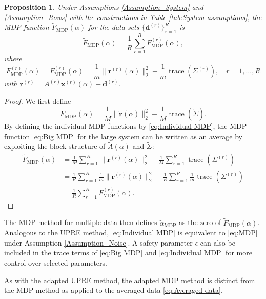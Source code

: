 \documentclass[12pt]{article}
\newcommand{\mA}{m}	%
\newcommand{\dVec}{\mathbf{d}}	%
\newcommand{\rVec}{\mathbf{r}}	%
\newcommand{\xVec}{\mathbf{x}}	%
\DeclareMathOperator{\trace}{trace}		%
\newcommand{\regparam}{\alpha}  %
\newcommand{\rBig}{\widetilde{\rVec}}	%
\newcommand{\ABig}{\widetilde{A}}	%
\newcommand{\D}{F_{\text{MDP}}}	%
\newcommand{\safeparam}{\epsilon}	%
\newcommand{\DBig}{\widetilde{F}_{\text{MDP}}}	%
\newtheorem{proposition}{Proposition}[section]
\begin{document}
\begin{proposition}
Under Assumptions \ref{Assumption_System} and \ref{Assumption_Rows} with the constructions in Table \ref{tab:System assumptions}, the MDP function $\DBig(\regparam)$ for the data sets $\{\dVec^{(r)}\}_{r=1}^R$ is
\begin{equation}
\label{eq:Averaged MDP}
\DBig(\regparam) = \frac{1}{R} \sum_{r=1}^R \D^{(r)}(\regparam),
\end{equation}
where
\begin{equation}
\label{eq:Individual MDP}
\D^{(r)}(\regparam) = \D^{(r)}(\regparam) = \frac{1}{\mA}\|\rVec^{(r)}(\regparam)\|_2^2 - \frac{1}{\mA}\trace\left(\Sigma^{(r)}\right), \quad r = 1,\ldots,R
\end{equation}
with $\rVec^{(r)} = A^{(r)}\xVec^{(r)}(\regparam) - \dVec^{(r)}$.
\end{proposition}

\begin{proof}
We first define
\begin{equation}
\label{eq:Big MDP}
\DBig(\regparam) = \frac{1}{M}\|\rBig(\regparam)\|_2^2 - \frac{1}{M}\trace\left(\widetilde{\Sigma}\right).
\end{equation}
By defining the individual MDP functions by \eqref{eq:Individual MDP}, the MDP function \eqref{eq:Big MDP} for the large system can be written as an average by exploiting the block structure of $\ABig(\regparam)$ and $\widetilde{\Sigma}$:
\begin{align*}
\DBig(\regparam) &= \frac{1}{M}\sum_{r=1}^R \|\rVec^{(r)}(\regparam)\|_2^2 - \frac{1}{M}\sum_{r=1}^R \trace\left(\Sigma^{(r)}\right) \nonumber \\
&= \frac{1}{R}\sum_{r=1}^R \frac{1}{\mA}\|\rVec^{(r)}(\regparam)\|_2^2 - \frac{1}{R}\sum_{r=1}^R \frac{1}{\mA}\trace\left(\Sigma^{(r)}\right) \nonumber \\
&= \frac{1}{R}\sum_{r=1}^R \D^{(r)}(\regparam).
\end{align*}
\end{proof}

The MDP method for multiple data then defines $\widetilde{\regparam}_{\textrm{MDP}}$ as the zero of $\DBig(\regparam)$. Analogous to the UPRE method, \eqref{eq:Individual MDP} is equivalent to \eqref{eq:MDP} under Assumption \ref{Assumption_Noise}. A safety parameter $\safeparam$ can also be included in the trace terms of \eqref{eq:Big MDP} and \eqref{eq:Individual MDP} for more control over selected parameters. \par 
As with the adapted UPRE method, the adapted MDP method is distinct from the MDP method as applied to the averaged data \eqref{eq:Averaged data}.
\end{document}
